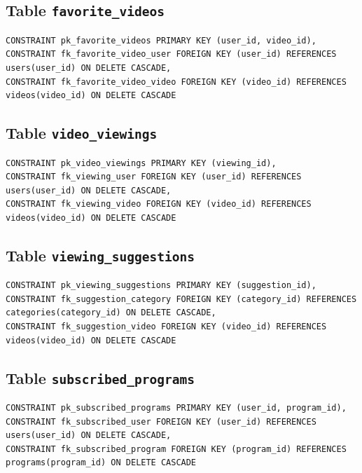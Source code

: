\documentclass[a4paper,12pt]{article}
\begin{document}
\subsection{Table \texttt{favorite\_videos}}

\begin{lstlisting}
CONSTRAINT pk_favorite_videos PRIMARY KEY (user_id, video_id),
CONSTRAINT fk_favorite_video_user FOREIGN KEY (user_id) REFERENCES users(user_id) ON DELETE CASCADE,
CONSTRAINT fk_favorite_video_video FOREIGN KEY (video_id) REFERENCES videos(video_id) ON DELETE CASCADE
\end{lstlisting}

\subsection{Table \texttt{video\_viewings}}

\begin{lstlisting}
CONSTRAINT pk_video_viewings PRIMARY KEY (viewing_id),
CONSTRAINT fk_viewing_user FOREIGN KEY (user_id) REFERENCES users(user_id) ON DELETE CASCADE,
CONSTRAINT fk_viewing_video FOREIGN KEY (video_id) REFERENCES videos(video_id) ON DELETE CASCADE
\end{lstlisting}

\subsection{Table \texttt{viewing\_suggestions}}

\begin{lstlisting}
CONSTRAINT pk_viewing_suggestions PRIMARY KEY (suggestion_id),
CONSTRAINT fk_suggestion_category FOREIGN KEY (category_id) REFERENCES categories(category_id) ON DELETE CASCADE,
CONSTRAINT fk_suggestion_video FOREIGN KEY (video_id) REFERENCES videos(video_id) ON DELETE CASCADE
\end{lstlisting}

\subsection{Table \texttt{subscribed\_programs}}

\begin{lstlisting}
CONSTRAINT pk_subscribed_programs PRIMARY KEY (user_id, program_id),
CONSTRAINT fk_subscribed_user FOREIGN KEY (user_id) REFERENCES users(user_id) ON DELETE CASCADE,
CONSTRAINT fk_subscribed_program FOREIGN KEY (program_id) REFERENCES programs(program_id) ON DELETE CASCADE
\end{lstlisting}
\end{document}
